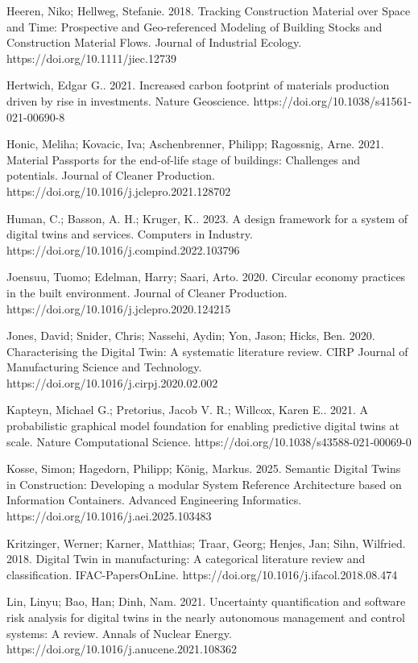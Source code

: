 Heeren, Niko; Hellweg, Stefanie. 2018. Tracking Construction Material over Space and Time: Prospective and Geo-referenced Modeling of Building Stocks and Construction Material Flows. Journal of Industrial Ecology. https://doi.org/10.1111/jiec.12739

Hertwich, Edgar G.. 2021. Increased carbon footprint of materials production driven by rise in investments. Nature Geoscience. https://doi.org/10.1038/s41561-021-00690-8

Honic, Meliha; Kovacic, Iva; Aschenbrenner, Philipp; Ragossnig, Arne. 2021. Material Passports for the end-of-life stage of buildings: Challenges and potentials. Journal of Cleaner Production. https://doi.org/10.1016/j.jclepro.2021.128702

Human, C.; Basson, A. H.; Kruger, K.. 2023. A design framework for a system of digital twins and services. Computers in Industry. https://doi.org/10.1016/j.compind.2022.103796

Joensuu, Tuomo; Edelman, Harry; Saari, Arto. 2020. Circular economy practices in the built environment. Journal of Cleaner Production. https://doi.org/10.1016/j.jclepro.2020.124215

Jones, David; Snider, Chris; Nassehi, Aydin; Yon, Jason; Hicks, Ben. 2020. Characterising the Digital Twin: A systematic literature review. CIRP Journal of Manufacturing Science and Technology. https://doi.org/10.1016/j.cirpj.2020.02.002

Kapteyn, Michael G.; Pretorius, Jacob V. R.; Willcox, Karen E.. 2021. A probabilistic graphical model foundation for enabling predictive digital twins at scale. Nature Computational Science. https://doi.org/10.1038/s43588-021-00069-0

Kosse, Simon; Hagedorn, Philipp; König, Markus. 2025. Semantic Digital Twins in Construction: Developing a modular System Reference Architecture based on Information Containers. Advanced Engineering Informatics. https://doi.org/10.1016/j.aei.2025.103483

Kritzinger, Werner; Karner, Matthias; Traar, Georg; Henjes, Jan; Sihn, Wilfried. 2018. Digital Twin in manufacturing: A categorical literature review and classification. IFAC-PapersOnLine. https://doi.org/10.1016/j.ifacol.2018.08.474

Lin, Linyu; Bao, Han; Dinh, Nam. 2021. Uncertainty quantification and software risk analysis for digital twins in the nearly autonomous management and control systems: A review. Annals of Nuclear Energy. https://doi.org/10.1016/j.anucene.2021.108362

